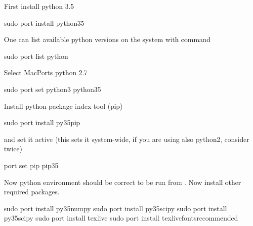 \documentclass[a4paper,11pt,english]{sphinxmanual}
\begin{document}
First install python 3.5

\begin{sphinxVerbatim}[commandchars=\\\{\},formatcom=\scriptsize]
\PYGZdl{} sudo port install python35
\end{sphinxVerbatim}

One can list available python versions on the system with command

\begin{sphinxVerbatim}[commandchars=\\\{\},formatcom=\scriptsize]
\PYGZdl{} sudo port  \PYGZhy{}\PYGZhy{}list python
\end{sphinxVerbatim}

Select MacPorts python 2.7

\begin{sphinxVerbatim}[commandchars=\\\{\},formatcom=\scriptsize]
\PYGZdl{} sudo port  \PYGZhy{}\PYGZhy{}set python3 python35
\end{sphinxVerbatim}

Install python package index tool (pip)

\begin{sphinxVerbatim}[commandchars=\\\{\},formatcom=\scriptsize]
\PYGZdl{} sudo port install py35\PYGZhy{}pip
\end{sphinxVerbatim}

and set it active (this sets it system-wide, if you are using also python2, consider twice)

\begin{sphinxVerbatim}[commandchars=\\\{\},formatcom=\scriptsize]
\PYGZdl{} port  \PYGZhy{}\PYGZhy{}set pip pip35
\end{sphinxVerbatim}

Now python environment should be correct to be run from . Now install other required packages.

\begin{sphinxVerbatim}[commandchars=\\\{\},formatcom=\scriptsize]
\PYGZdl{} sudo port install py35\PYGZhy{}numpy
\PYGZdl{} sudo port install py35\PYGZhy{}scipy
\PYGZdl{} sudo port install py35\PYGZhy{}scipy
\PYGZdl{} sudo port install texlive
\PYGZdl{} sudo port install texlive\PYGZhy{}fonts\PYGZhy{}recommended
\end{sphinxVerbatim}
\end{document}
